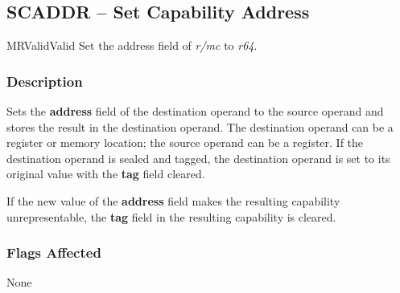 \clearpage
{}
{}
\subsection*{SCADDR -- Set Capability Address}

\begin{x86opcodetable}
  {MR}{Valid}{Valid}
  {Set the address field of \emph{r/mc} to \emph{r64}.}
\end{x86opcodetable}

\begin{x86opentable}
\end{x86opentable}

\subsubsection*{Description}

Sets the \textbf{address} field of the destination operand to the
source operand and stores the result in the destination operand.  The
destination operand can be a register or memory location; the source
operand can be a register.  If the destination operand is sealed and
tagged, the destination operand is set to its original value with the
\textbf{tag} field cleared.

If the new value of the \textbf{address} field makes the resulting
capability unrepresentable, the \textbf{tag} field in the resulting
capability is cleared.

\subsubsection*{Flags Affected}

None

